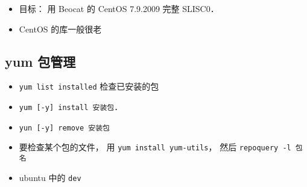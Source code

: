 
\begin{issues}
\issueDraft
\end{issues}

\begin{itemize}
\item 目标： 用 Beocat 的 CentOS 7.9.2009 完整 SLISC0．
\item CentOS 的库一般很老
\end{itemize}

\subsection{yum 包管理}
\begin{itemize}
\item \verb|yum list installed| 检查已安装的包
\item \verb|yum [-y] install 安装包|．
\item \verb|yun [-y] remove 安装包|
\item 要检查某个包的文件， 用 \verb|yum install yum-utils|， 然后 \verb|repoquery -l 包名|
\item ubuntu 中的 \verb|dev|
\end{itemize}
